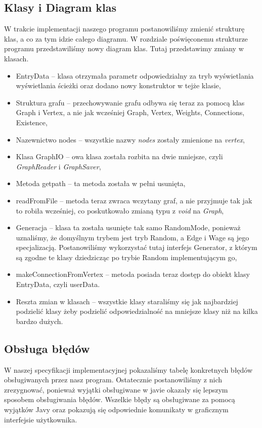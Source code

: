 \documentclass[10pt, a4paper]{report}
\begin{document}
\subsection{Klasy i Diagram klas}\label{subsec:klasy-i-diagram-klas}
W trakcie implementacji naszego programu postanowiliśmy zmienić strukturę klas, a co za tym idzie całego diagramu. W rozdziale poświęconemu strukturze programu przedstawiliśmy nowy diagram klas.
Tutaj przedstawimy zmiany w klasach.
\begin{itemize}
  \item EntryData -- klasa otrzymała parametr odpowiedzialny za tryb wyświetlania wyświetlania ścieżki oraz dodano nowy konstruktor w tejże klasie,
  \item Struktura grafu -- przechowywanie grafu odbywa się teraz za pomocą klas Graph i Vertex, a nie jak wcześniej Graph, Vertex, Weights, Connections, Existence,
  \item Nazewnictwo nodes -- wszystkie nazwy \textit{nodes} zostały zmienione na \textit{vertex},
  \item Klasa GraphIO -- owa klasa została rozbita na dwie mniejsze, czyli \textit{GraphReader} i \textit{GraphSaver},
  \item Metoda getpath -- ta metoda została w pełni usunięta,
  \item readFromFile -- metoda teraz zwraca wczytany graf, a nie przyjmuje tak jak to robiła wcześniej, co poskutkowało zmianą typu z \textit{void} na \textit{Graph},
  \item Generacja -- klasa ta została usunięte tak samo RandomMode, ponieważ uznaliśmy, że domyślnym trybem jest tryb Random, a Edge i Wage są jego specjalizacją. Postanowiliśmy wykorzystać tutaj interfejs Generator, z którym są zgodne te klasy dziedzicząc po trybie Random implementującym go,
  \item makeConnectionFromVertex -- metoda posiada teraz dostęp do obiekt klasy EntryData, czyli userData.
  \item Reszta zmian w klasach -- wszystkie klasy staraliśmy się jak najbardziej podzielić klasy żeby podzielić odpowiedzialność na mniejsze klasy niż na kilka bardzo dużych.
\end{itemize}

\subsection{Obsługa błędów}\label{subsec:obsługa-błędów}
W naszej specyfikacji implementacyjnej pokazaliśmy tabelę konkretnych błędów obsługiwanych przez nasz program. Ostatecznie postanowiliśmy z nich zrezygnować, ponieważ wyjątki obsługiwane w javie okazały się lepszym
sposobem obsługiwania błędów. Wszelkie błędy są obsługiwane za pomocą wyjątków Javy oraz pokazują się odpowiednie komunikaty w graficznym interfejsie użytkownika.
\end{document}
